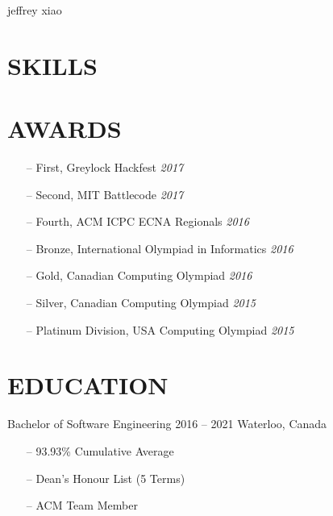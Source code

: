 \documentclass{resume}
\begin{document}
  \header%
    {jeffrey}%
    {xiao}%
    {}%
    {%
      \ %
      \ %
      \ %
    }%
  \begin{sidebar}
    \section{SKILLS}
    \section{AWARDS}
      \begin{itemize}[leftmargin=0.45cm, topsep=0.0cm]%
        \item[--] First, Greylock Hackfest \separator\emph{2017}
        \item[--] Second, MIT Battlecode \separator\emph{2017}
        \item[--] Fourth, ACM ICPC ECNA Regionals \separator\emph{2016}
        \item[--] Bronze, International Olympiad in Informatics \separator\emph{2016}
        \item[--] Gold, Canadian Computing Olympiad \separator\emph{2016}
        \item[--] Silver, Canadian Computing Olympiad \separator\emph{2015}
        \item[--] Platinum Division, USA Computing Olympiad \separator\emph{2015}
      \end{itemize}%
    \section{EDUCATION}
      \color{tagText}Bachelor of Software Engineering
      \color{subTagText}2016 -- 2021 \separator\color{subTagText}Waterloo, Canada
      \color{bodyText}%
      \begin{itemize}[leftmargin=0.45cm, noitemsep, topsep=0.0cm]%
        \item[--] 93.93\% Cumulative Average
        \item[--] Dean's Honour List (5 Terms)
        \item[--] ACM Team Member
      \end{itemize}%

\end{sidebar}
\end{document}
